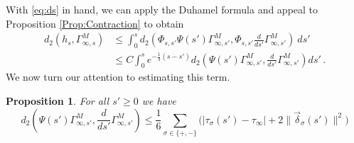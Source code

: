 \documentclass{article}
\newtheorem{Prop}{Proposition}
\begin{document}
With \eqref{eq:ds} in hand, we can apply the Duhamel formula and appeal to Proposition \ref{Prop:Contraction} to obtain
\[
\begin{aligned}
d_2(h_s, \Gamma^M_{\infty,s}) &\leq \int_0^s d_2\left(\Phi_{s,s'} \Psi(s') \Gamma^M_{\infty,s'},
\Phi_{s,s'}\frac{d}{ds'} \Gamma^M_{\infty,s'}\right) \ ds'\\
&\leq C\int_0^s  e^{-\frac 13(s - s')}d_2\left(\Psi(s') \Gamma^M_{\infty,s'},
\frac{d}{ds'} \Gamma^M_{\infty,s'}\right)ds' \, .
\end{aligned}
\]
We now turn our attention to estimating this term.

\begin{Prop}\label{Prop:tedious}
For all $s' \geq 0$ we have 
\begin{equation*} 
d_2\left(\Psi(s') \Gamma^M_{\infty,s'},
\frac{d}{ds'} \Gamma^M_{\infty,s'}\right) \leq \frac 1 6  \sum_{\sigma\in\{+,-\}}\big(|\tau_\sigma(s') - \tau_\infty| + 
2\|\vec\delta_\sigma(s')\|^2\big)
\end{equation*} 
\end{Prop}
\end{document}

